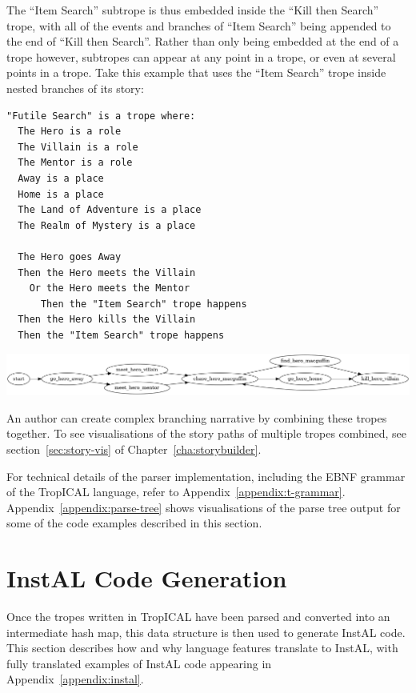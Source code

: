 \documentclass[11pt]{report}
\begin{document}
The ``Item Search'' subtrope is thus embedded inside the ``Kill then Search''
trope, with all of the events and branches of ``Item Search'' being appended to
the end of ``Kill then Search''. Rather than only being embedded at the end of a
trope however, subtropes can appear at any point in a trope, or even at several
points in a trope. Take this example that uses the ``Item Search'' trope inside
nested branches of its story:

\begin{lstlisting}[showstringspaces=false, label={lst:subtrope3}, caption={Subtrope in multiple places}]
"Futile Search" is a trope where:
  The Hero is a role
  The Villain is a role
  The Mentor is a role
  Away is a place
  Home is a place
  The Land of Adventure is a place
  The Realm of Mystery is a place

  The Hero goes Away
  Then the Hero meets the Villain
    Or the Hero meets the Mentor
      Then the "Item Search" trope happens
  Then the Hero kills the Villain
  Then the "Item Search" trope happens
\end{lstlisting}

\vspace{7mm}
\centerline{\includegraphics[width=\textwidth]{subtrope3.png}}
\vspace{7mm}

An author can create complex branching narrative by combining these tropes together. To see
visualisations of the story paths of multiple tropes combined, see
section~\ref{sec:story-vis} of Chapter~\ref{cha:storybuilder}.

For technical details of the parser implementation, including the EBNF grammar
of the TropICAL language, refer to Appendix~\ref{appendix:t-grammar}.
Appendix~\ref{appendix:parse-tree} shows visualisations of the parse tree output for some
of the code examples described in this section.

\section{InstAL Code Generation}
\label{sec:t-codegen}
Once the tropes written in TropICAL have been parsed and converted into an
intermediate hash map, this data structure is then used to generate InstAL code.
This section describes how and why language features translate to
InstAL, with fully translated examples of InstAL code appearing in Appendix~\ref{appendix:instal}.
\end{document}
